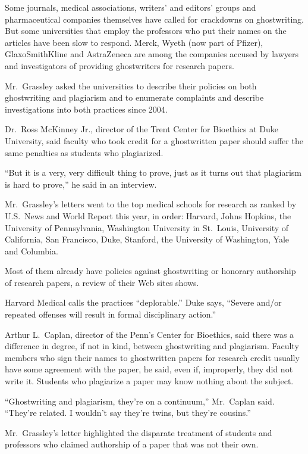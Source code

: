 ﻿\documentclass[12pt]{article}
\begin{document}
Some journals, medical associations, writers' and editors' groups and pharmaceutical companies
themselves have called for crackdowns on ghostwriting. But some universities that employ the
professors who put their names on the articles have been slow to respond. Merck, Wyeth (now part of
Pfizer), GlaxoSmithKline and AstraZeneca are among the companies accused by lawyers and
investigators of providing ghostwriters for research papers.

Mr.~Grassley asked the universities to describe their policies on both ghostwriting and plagiarism
and to enumerate complaints and describe investigations into both practices since 2004.

Dr.~Ross McKinney Jr., director of the Trent Center for Bioethics at Duke University, said faculty
who took credit for a ghostwritten paper should suffer the same penalties as students who
plagiarized.

``But it is a very, very difficult thing to prove, just as it turns out that plagiarism is hard to
prove,'' he said in an interview.

Mr.~Grassley's letters went to the top medical schools for research as ranked by U.S.~News and World
Report this year, in order: Harvard, Johns Hopkins, the University of Pennsylvania, Washington
University in St.~Louis, University of California, San Francisco, Duke, Stanford, the University of
Washington, Yale and Columbia.

Most of them already have policies against ghostwriting or honorary authorship of research papers, a
review of their Web sites shows.

Harvard Medical calls the practices ``deplorable.'' Duke says, ``Severe and/or repeated offenses
will result in formal disciplinary action.''

Arthur L.~Caplan, director of the Penn's Center for Bioethics, said there was a difference in
degree, if not in kind, between ghostwriting and plagiarism. Faculty members who sign their names to
ghostwritten papers for research credit usually have some agreement with the paper, he said, even
if, improperly, they did not write it. Students who plagiarize a paper may know nothing about the
subject.

``Ghostwriting and plagiarism, they're on a continuum,'' Mr.~Caplan said. ``They're related. I
wouldn't say they're twins, but they're cousins.''

Mr.~Grassley's letter highlighted the disparate treatment of students and professors who claimed
authorship of a paper that was not their own.
\end{document}
